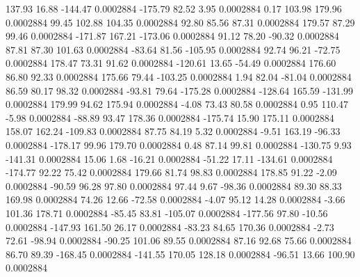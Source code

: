       137.93       16.88     -144.47     0.0002884
     -175.79       82.52        3.95     0.0002884
        0.17      103.98      179.96     0.0002884
       99.45      102.88      104.35     0.0002884
       92.80       85.56       87.31     0.0002884
      179.57       87.29       99.46     0.0002884
     -171.87      167.21     -173.06     0.0002884
       91.12       78.20      -90.32     0.0002884
       87.81       87.30      101.63     0.0002884
      -83.64       81.56     -105.95     0.0002884
       92.74       96.21      -72.75     0.0002884
      178.47       73.31       91.62     0.0002884
     -120.61       13.65      -54.49     0.0002884
      176.60       86.80       92.33     0.0002884
      175.66       79.44     -103.25     0.0002884
        1.94       82.04      -81.04     0.0002884
       86.59       80.17       98.32     0.0002884
      -93.81       79.64     -175.28     0.0002884
     -128.64      165.59     -131.99     0.0002884
      179.99       94.62      175.94     0.0002884
       -4.08       73.43       80.58     0.0002884
        0.95      110.47       -5.98     0.0002884
      -88.89       93.47      178.36     0.0002884
     -175.74       15.90      175.11     0.0002884
      158.07      162.24     -109.83     0.0002884
       87.75       84.19        5.32     0.0002884
       -9.51      163.19      -96.33     0.0002884
     -178.17       99.96      179.70     0.0002884
        0.48       87.14       99.81     0.0002884
     -130.75        9.93     -141.31     0.0002884
       15.06        1.68      -16.21     0.0002884
      -51.22       17.11     -134.61     0.0002884
     -174.77       92.22       75.42     0.0002884
      179.66       81.74       98.83     0.0002884
      178.85       91.22       -2.09     0.0002884
      -90.59       96.28       97.80     0.0002884
       97.44        9.67      -98.36     0.0002884
       89.30       88.33      169.98     0.0002884
       74.26       12.66      -72.58     0.0002884
       -4.07       95.12       14.28     0.0002884
       -3.66      101.36      178.71     0.0002884
      -85.45       83.81     -105.07     0.0002884
     -177.56       97.80      -10.56     0.0002884
     -147.93      161.50       26.17     0.0002884
      -83.23       84.65      170.36     0.0002884
       -2.73       72.61      -98.94     0.0002884
      -90.25      101.06       89.55     0.0002884
       87.16       92.68       75.66     0.0002884
       86.70       89.39     -168.45     0.0002884
     -141.55      170.05      128.18     0.0002884
      -96.51       13.66      100.90     0.0002884
